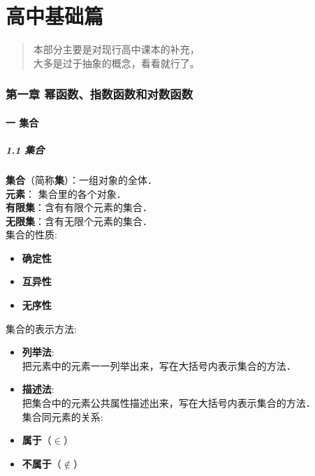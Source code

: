 \documentclass[
]{article}
\author{}
\date{}
\begin{document}
\tableofcontents

\hypertarget{ux9ad8ux4e2dux57faux7840ux7bc7}{%
\section{高中基础篇}\label{ux9ad8ux4e2dux57faux7840ux7bc7}}

\begin{quote}
本部分主要是对现行高中课本的补充，\\
大多是过于抽象的概念，看看就行了。
\end{quote}

\hypertarget{ux7b2cux4e00ux7ae0--ux5e42ux51fdux6570ux6307ux6570ux51fdux6570ux548cux5bf9ux6570ux51fdux6570}{%
\subsubsection{第一章
幂函数、指数函数和对数函数}\label{ux7b2cux4e00ux7ae0--ux5e42ux51fdux6570ux6307ux6570ux51fdux6570ux548cux5bf9ux6570ux51fdux6570}}

\hypertarget{ux4e00--ux96c6ux5408}{%
\paragraph{一 集合}\label{ux4e00--ux96c6ux5408}}

\hypertarget{11--ux96c6ux5408}{%
\subparagraph{1.1 集合}\label{11--ux96c6ux5408}}

\textbf{集合}（简称\textbf{集}）：一组对象的全体．\\
\textbf{元素}： 集合里的各个对象．\\
\textbf{有限集}：含有有限个元素的集合．\\
\textbf{无限集}：含有无限个元素的集合．\\
集合的性质:

\begin{itemize}
\item
  \textbf{确定性}
\item
  \textbf{互异性}
\item
  \textbf{无序性}
\end{itemize}

集合的表示方法:

\begin{itemize}
\item
  \textbf{列举法}: \\
  把元素中的元素一一列举出来，写在大括号内表示集合的方法．
\item
  \textbf{描述法}:\\
  把集合中的元素公共属性描述出来，写在大括号内表示集合的方法．\\
  集合同元素的关系:
\item
  \textbf{属于}（\textbf{\(\in\)}）
\item
  \textbf{不属于}（\textbf{\(\notin\)}）
\end{itemize}
\end{document}
